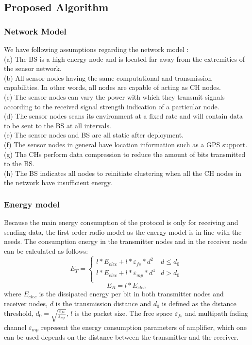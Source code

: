 \documentclass[11pt]{report}
\begin{document}
    \subsection{Proposed Algorithm}
	\subsubsection{Network Model}
	We have following assumptions regarding the network model \cite{article} \cite{7763028}:\\
	(a) The BS is a high energy node and is located far away from the extremities of the sensor network.\\
	(b) All sensor nodes having the same computational and transmission capabilities. In other words, all nodes are capable of acting as CH nodes.\\
	(c) The sensor nodes can vary the power with which they transmit signals according to the received signal strength indication of a particular node.\\
	(d) The sensor nodes scans its environment at a fixed rate and will contain data to be sent to the BS at all intervals.\\
	(e) The sensor nodes and BS are all static after deployment.\\
	(f) The sensor nodes in general have location information such as a GPS support.\\
	(g) The CHs perform data compression to reduce the amount of bits transmitted to the BS.\\
	(h) The BS indicates all nodes to reinitiate clustering when all the CH nodes in the network have insufficient energy.
	
	\subsubsection{Energy model}
	
	Because the main energy consumption of the protocol is only for receiving and sending data, the first order radio model as the energy model is in line with the needs. The consumption energy in the transmitter nodes and in the receiver node can be calculated as follows:
	\begin{equation}
	E_{T}=\left\{ \begin{array}{ll}
	l * E_{elec} + l * \varepsilon_{fs} * d^2 & d \leq d_0 \\
	l * E_{elec} + l * \varepsilon_{mp} * d^4 & d > d_0 \\
	\end{array} \right.
	\end{equation}
	\begin{equation}
	E_R = l * E_{elec}
	\end{equation}
	where $E_{elec}$ is the dissipated energy per bit in both transmitter nodes and receiver nodes, $d$ is the transmission distance and $d_0$ is defined as the distance threshold, $d_0 = \sqrt{\frac{\varepsilon_{fs}}{\varepsilon_{mp}}}$, $l$ is the packet size. The free space $\varepsilon_{fs}$ and multipath fading channel $\varepsilon_{mp}$ represent the energy consumption parameters of amplifier, which one can be used depends on the distance between the transmitter and the receiver. 
	
\end{document}
